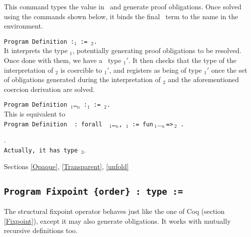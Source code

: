 This command types the value {\term} in \Russell\ and generate proof
obligations. Once solved using the commands shown below, it binds the final
\Coq\ term to the name {\ident} in the environment.

\begin{ErrMsgs}
\item {}
\end{ErrMsgs}

\begin{Variants}
\item {\tt Program Definition {\ident} {\tt :}{\term$_1$} :=
    {\term$_2$}.}\\
  It interprets the type {\term$_1$}, potentially generating proof
  obligations to be resolved. Once done with them, we have a \Coq\ type
  {\term$_1'$}. It then checks that the type of the interpretation of
  {\term$_2$} is coercible to {\term$_1'$}, and registers {\ident} as
  being of type {\term$_1'$} once the set of obligations generated
  during the interpretation of {\term$_2$} and the aforementioned
  coercion derivation are solved.
\item {\tt Program Definition {\ident} {\binder$_1$}\ldots{\binder$_n$}
       {\tt :}\term$_1$ {\tt :=} {\term$_2$}.}\\
  This is equivalent to \\
   {\tt Program Definition\,{\ident}\,{\tt :\,forall}\,%
       {\binder$_1$}\ldots{\binder$_n$}{\tt ,}\,\term$_1$\,{\tt :=}}\,%
       {\tt fun}\,{\binder$_1$}\ldots{\binder$_n$}\,{\tt =>}\,{\term$_2$}\,%
       {\tt .}
\end{Variants}

\begin{ErrMsgs}
\item {}.\\
    \texttt{Actually, it has type {\term$_3$}}.
\end{ErrMsgs}

\SeeAlso Sections \ref{Opaque}, \ref{Transparent}, \ref{unfold}

\subsection{\tt Program Fixpoint {\ident} {\params} {\tt \{order\}} : type := \term
  \label{ProgramFixpoint}}

The structural fixpoint operator behaves just like the one of Coq
(section \ref{Fixpoint}), except it may also generate obligations.
It works with mutually recursive definitions too.

